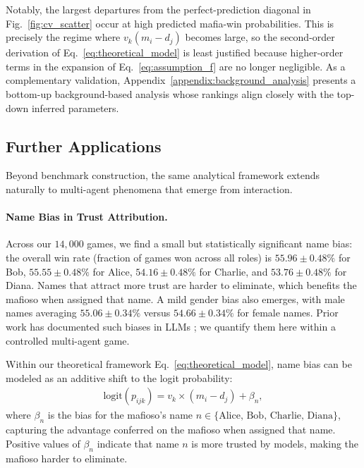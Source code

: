 \documentclass{article}
\begin{document}
Notably, the largest departures from the perfect-prediction diagonal in Fig.~\ref{fig:cv_scatter} occur at high predicted mafia-win probabilities. This is precisely the regime where $v_k(m_i-d_j)$ becomes large, so the second-order derivation of Eq.~\eqref{eq:theoretical_model} is least justified because higher-order terms in the expansion of Eq.~\eqref{eq:assumption_f} are no longer negligible. As a complementary validation, Appendix~\ref{appendix:background_analysis} presents a bottom-up background-based analysis whose rankings align closely with the top-down inferred parameters.

\subsection{Further Applications}
\label{sec:serendipitous_results}

Beyond benchmark construction, the same analytical framework extends naturally to multi-agent phenomena that emerge from interaction.

\paragraph{Name Bias in Trust Attribution.}

Across our $14{,}000$ games, we find a small but statistically significant name bias: the overall win rate (fraction of games won across all roles) is $55.96\pm 0.48\%$ for Bob, $55.55\pm 0.48\%$ for Alice, $54.16\pm 0.48\%$ for Charlie, and $53.76\pm 0.48\%$ for Diana. Names that attract more trust are harder to eliminate, which benefits the mafioso when assigned that name. A mild gender bias also emerges, with male names averaging $55.06 \pm 0.34\%$ versus $54.66 \pm 0.34\%$ for female names. Prior work has documented such biases in LLMs \citep{bai2024social}; we quantify them here within a controlled multi-agent game.

Within our theoretical framework Eq.~\ref{eq:theoretical_model}, name bias can be modeled as an additive shift to the logit probability:
\begin{align}
\text{logit}(p_{ijk}) = v_k \times (m_i - d_j) + \beta_n,
\label{eq:model_with_name_bias}
\end{align}
where $\beta_n$ is the bias for the mafioso's name $n \in \{\text{Alice, Bob, Charlie, Diana}\}$, capturing the advantage conferred on the mafioso when assigned that name. Positive values of $\beta_n$ indicate that name $n$ is more trusted by models, making the mafioso harder to eliminate.
\end{document}
